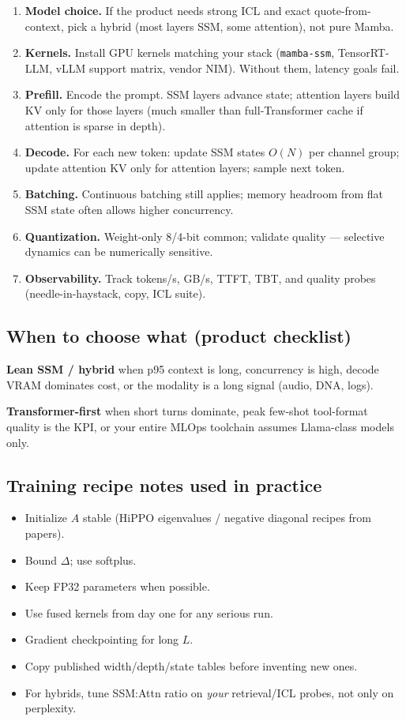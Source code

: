 \documentclass[11pt,a4paper]{article}
\begin{document}
\begin{enumerate}[leftmargin=*]
  \item \textbf{Model choice.} If the product needs strong ICL and exact quote-from-context, pick a hybrid (most layers SSM, some attention), not pure Mamba.
  \item \textbf{Kernels.} Install GPU kernels matching your stack (\texttt{mamba-ssm}, TensorRT-LLM, vLLM support matrix, vendor NIM). Without them, latency goals fail.
  \item \textbf{Prefill.} Encode the prompt. SSM layers advance state; attention layers build KV only for those layers (much smaller than full-Transformer cache if attention is sparse in depth).
  \item \textbf{Decode.} For each new token: update SSM states $O(N)$ per channel group; update attention KV only for attention layers; sample next token.
  \item \textbf{Batching.} Continuous batching still applies; memory headroom from flat SSM state often allows higher concurrency.
  \item \textbf{Quantization.} Weight-only 8/4-bit common; validate quality --- selective dynamics can be numerically sensitive.
  \item \textbf{Observability.} Track tokens/s, GB/s, TTFT, TBT, and quality probes (needle-in-haystack, copy, ICL suite).
\end{enumerate}

\subsection{When to choose what (product checklist)}

\textbf{Lean SSM / hybrid} when p95 context is long, concurrency is high, decode VRAM dominates cost, or the modality is a long signal (audio, DNA, logs).

\textbf{Transformer-first} when short turns dominate, peak few-shot tool-format quality is the KPI, or your entire MLOps toolchain assumes Llama-class models only.

\subsection{Training recipe notes used in practice}

\begin{itemize}[leftmargin=*]
  \item Initialize $A$ stable (HiPPO eigenvalues / negative diagonal recipes from papers).
  \item Bound $\Delta$; use softplus.
  \item Keep FP32 parameters when possible.
  \item Use fused kernels from day one for any serious run.
  \item Gradient checkpointing for long $L$.
  \item Copy published width/depth/state tables before inventing new ones.
  \item For hybrids, tune SSM:Attn ratio on \emph{your} retrieval/ICL probes, not only on perplexity.
\end{itemize}
\end{document}

